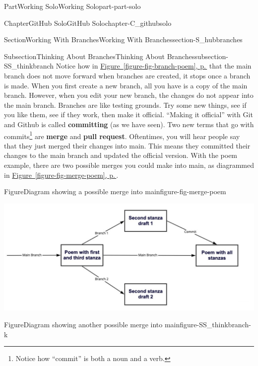 \documentclass[twoside,10pt,]{book}
\newcommand{\xreffont}{\relax}
\newcommand{\terminology}[1]{\textbf{#1}}
\begin{document}
\begin{partptx}{Part}{Working Solo}{}{Working Solo}{}{}{part-part-solo}
\begin{chapterptx}{Chapter}{GitHub Solo}{}{GitHub Solo}{}{}{chapter-C_githubsolo}
\begin{sectionptx}{Section}{Working With Branches}{}{Working With Branches}{}{}{section-S_hubbranches}
\begin{subsectionptx}{Subsection}{Thinking About Branches}{}{Thinking About Branches}{}{}{subsection-SS_thinkbranch}
 Notice how in \hyperref[figure-fig-branch-poem]{Figure~{\xreffont\ref{figure-fig-branch-poem}}, p.\,\pageref{figure-fig-branch-poem}} that the main branch does not move forward when branches are created, it stops once a branch is made. When you first create a new branch, all you have is a copy of the main branch. However, when you edit your new branch, the changes do not appear into the main branch. Branches are like testing grounds. Try some new things, see if you like them, see if they work, then make it official. ``Making it official'' with Git and Github is called \terminology{committing} (as we have seen). Two new terms that go with commits\footnote{Notice how ``commit'' is both a noun and a verb.\label{fn-SS_thinkbranch-i-k}} are \terminology{merge} and \terminology{pull request}. Oftentimes, you will hear people say that they just merged their changes into main. This means they committed their changes to the main branch and updated the official version. With the poem example, there are two possible merges you could make into main, as diagrammed in \hyperref[figure-fig-merge-poem]{Figure~{\xreffont\ref{figure-fig-merge-poem}}, p.\,\pageref{figure-fig-merge-poem}}.%
\begin{figureptx}{Figure}{Diagram showing a possible merge into main}{figure-fig-merge-poem}{}%
\begin{image}{0.05}{0.9}{0.05}{}%
\includegraphics[width=\linewidth]{external/merge_poem1.pdf}
\end{image}%
\tcblower
\end{figureptx}%
\begin{figureptx}{Figure}{Diagram showing another possible merge into main}{figure-SS_thinkbranch-k}{}%
\begin{image}{0.05}{0.9}{0.05}{}%

\end{image}
\end{figureptx}
\end{subsectionptx}
\end{sectionptx}
\end{chapterptx}
\end{partptx}
\end{document}
